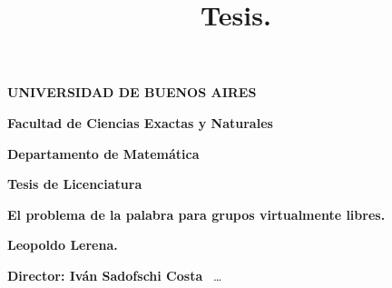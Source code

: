 \documentclass[12pt]{book}
\title{\color{red!55!black} Tesis.}
\date{}
\theoremstyle{plain} %
\theoremstyle{definition}
\theoremstyle{remark}
\begin{document}
\thispagestyle{empty}

\begin {center}


\medskip
\textbf{UNIVERSIDAD DE BUENOS AIRES}

\smallskip

\textbf{Facultad de Ciencias Exactas y Naturales}

\smallskip

\textbf{Departamento de Matem\'atica}

\vspace{3.5cm}

\textbf{\large Tesis de Licenciatura}


\vspace{1.5cm}

\textbf{\large El problema de la palabra para grupos virtualmente libres.}

\vspace{1.5cm}


\textbf{Leopoldo Lerena.}

\end {center}


\vspace{1.5cm}

\noindent \textbf{Director: Iván Sadofschi Costa} \ \dots


\vspace{3cm}

\tableofcontents
\newpage
	
	




\end{document}
